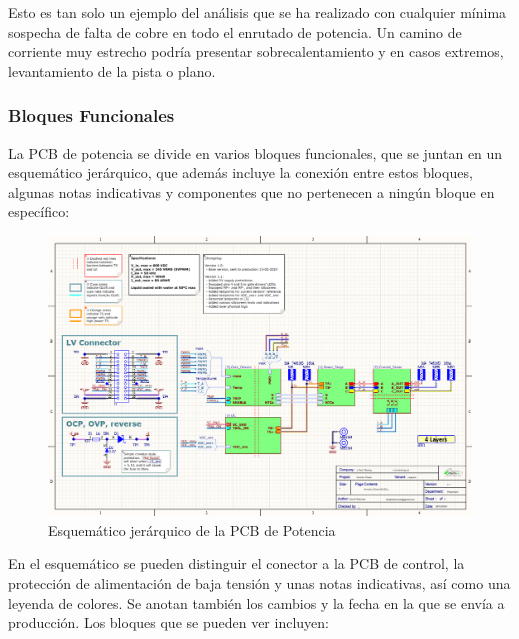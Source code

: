 Esto es tan solo un ejemplo del análisis que se ha realizado con cualquier mínima sospecha de falta de cobre en todo el enrutado de potencia. Un camino de corriente muy estrecho podría presentar sobrecalentamiento y en casos extremos, levantamiento de la pista o plano.

\subsubsection{Bloques Funcionales}

La PCB de potencia se divide en varios bloques funcionales, que se juntan en un esquemático jerárquico, que además incluye la conexión entre estos bloques, algunas notas indicativas y componentes que no pertenecen a ningún bloque en específico:

\begin{figure}[H]
	\centering
	\includegraphics[width=0.8\linewidth]{fig/schPower1}
	\caption{Esquemático jerárquico de la PCB de Potencia}
\end{figure}

En el esquemático se pueden distinguir el conector a la PCB de control, la protección de alimentación de baja tensión y unas notas indicativas, así como una leyenda de colores. Se anotan también los cambios y la fecha en la que se envía a producción. Los bloques que se pueden ver incluyen:

